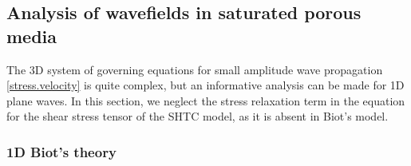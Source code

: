 \documentclass[3p,times,table]{article}
\begin{document}
\subsection{Analysis of wavefields in saturated porous 
 	media}\label{sec.waves}
 
The 3D system of governing equations for small amplitude wave propagation  
\eqref{stress.velocity} is quite complex, but an informative analysis can be 
made for 1D plane waves. In this section, we neglect the stress 
relaxation term in the equation for the shear stress tensor of the SHTC model, as it 
is absent in  
Biot's model.

%


  

\subsubsection{1D Biot's theory}
\end{document}
